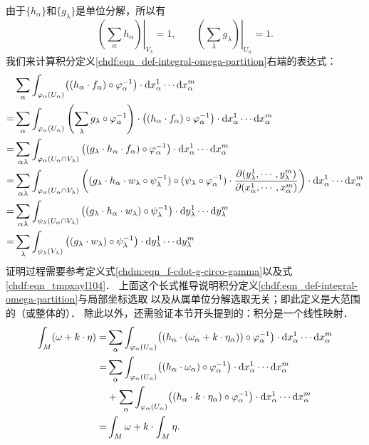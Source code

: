 由于$\{h_\alpha\}$和$\{g_\lambda\}$是单位分解，所以有
\begin{equation}
    \left. \left(\sum_{\alpha}h_\alpha\right) \right|_{V_\lambda} = 1, \qquad
    \left. \left(\sum_{\lambda}g_\lambda\right) \right|_{U_\alpha} = 1 .
\end{equation}
我们来计算积分定义\eqref{chdf:eqn_def-integral-omega-partition}右端的表达式：
\begin{align*}
    &\sum_{\alpha}\int_{\varphi_\alpha(U_\alpha)}   \bigl( (h_\alpha \cdot f_\alpha )
    \circ\varphi^{-1}_\alpha\bigr)\cdot  {\rm d}x^1_\alpha \cdots {\rm d}x^m_\alpha \\
    =&\sum_{\alpha}\int_{\varphi_\alpha(U_\alpha)}  \left(\sum_{\lambda}g_\lambda \circ
    \varphi^{-1}_\alpha \right) \cdot
    \bigl( (h_\alpha \cdot f_\alpha )\circ \varphi^{-1}_\alpha\bigr)
    \cdot {\rm d}x^1_\alpha \cdots {\rm d}x^m_\alpha  \\
    =&\sum_{\alpha\lambda} \int_{\varphi_\alpha(U_\alpha\cap V_\lambda)}  \left( (g_\lambda \cdot
       h_\alpha \cdot f_\alpha ) \circ \varphi^{-1}_\alpha \right) \cdot
    {\rm d}x^1_\alpha \cdots {\rm d}x^m_\alpha \\
    =&\sum_{\alpha\lambda} \int_{\varphi_\alpha(U_\alpha\cap V_\lambda)}  \left( (g_\lambda \cdot
    h_\alpha \cdot  w_\lambda \circ \psi^{-1}_\lambda )
    \circ (\psi_\lambda \circ \varphi^{-1}_\alpha)
    \cdot\frac{\partial (y^1_\lambda,\cdots, y^m_\lambda)}
    {\partial (x^1_\alpha, \cdots, x^m_\alpha)}  \right) \cdot
    {\rm d}x^1_\alpha \cdots {\rm d}x^m_\alpha \\
    =&\sum_{\alpha\lambda} \int_{\psi_\lambda(U_\alpha\cap V_\lambda)}
    \left( (g_\lambda \cdot
    h_\alpha \cdot w_\lambda) \circ \psi^{-1}_\lambda
     \right) \cdot  {\rm d}y^1_\lambda \cdots {\rm d}y^m_\lambda \\
   =&\sum_{\lambda} \int_{\psi_\lambda(V_\lambda)}  \left( (g_\lambda
     \cdot w_\lambda ) \circ \psi^{-1}_\lambda \right)
     \cdot  {\rm d}y^1_\lambda \cdots {\rm d}y^m_\lambda
\end{align*}
证明过程需要参考定义式\eqref{chdm:eqn_f-cdot-g-circo-gamma}以及式\eqref{chdf:eqn_tmpxayl104}．
上面这个长式推导说明积分定义\eqref{chdf:eqn_def-integral-omega-partition}与局部坐标选取
以及从属单位分解选取无关；即此定义是大范围的（或整体的）．
除此以外，还需验证本节开头提到的：积分是一个线性映射．
\begin{align*}
    \int_{M} (\omega + k\cdot \eta ) =&
    \sum_{\alpha}\int_{\varphi_\alpha(U_\alpha)}  \bigl( (h_\alpha \cdot (\omega_\alpha+k\cdot \eta_\alpha ) )
    \circ\varphi^{-1}_\alpha\bigr)\cdot  {\rm d}x^1_\alpha \cdots {\rm d}x^m_\alpha \\
    =&\sum_{\alpha}\int_{\varphi_\alpha(U_\alpha)}  \bigl( (h_\alpha \cdot \omega_\alpha )
    \circ\varphi^{-1}_\alpha\bigr)\cdot  {\rm d}x^1_\alpha \cdots {\rm d}x^m_\alpha \\
     &+\sum_{\alpha}\int_{\varphi_\alpha(U_\alpha)}  \bigl( (h_\alpha \cdot k\cdot\eta_\alpha )
    \circ\varphi^{-1}_\alpha\bigr)\cdot  {\rm d}x^1_\alpha \cdots {\rm d}x^m_\alpha \\
    =&\int_{M} \omega  +k\cdot \int_{M} \eta .
\end{align*} %
